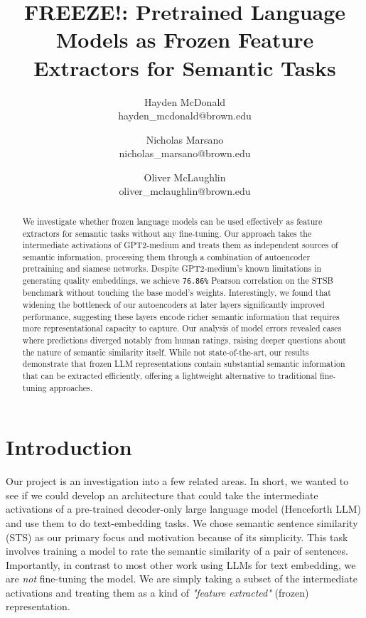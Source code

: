\documentclass[14pt]{article}
\title{FREEZE!: Pretrained Language Models as Frozen Feature Extractors for Semantic Tasks}
\author{
    Hayden McDonald\\hayden\_mcdonald@brown.edu \and 
    Nicholas Marsano\\nicholas\_marsano@brown.edu\and 
    Oliver McLaughlin\\oliver\_mclaughlin@brown.edu
}
\begin{document}
\maketitle


\begin{abstract}
    We investigate whether frozen language models can be used effectively as feature extractors for semantic tasks without any fine-tuning. Our approach takes the intermediate activations of GPT2-medium and treats them as independent sources of semantic information, processing them through a combination of autoencoder pretraining and siamese networks. Despite GPT2-medium's known limitations in generating quality embeddings, we achieve \verb|76.86%| Pearson correlation on the STSB benchmark without touching the base model's weights. Interestingly, we found that widening the bottleneck of our autoencoders at later layers significantly improved performance, suggesting these layers encode richer semantic information that requires more representational capacity to capture. Our analysis of model errors revealed cases where predictions diverged notably from human ratings, raising deeper questions about the nature of semantic similarity itself. While not state-of-the-art, our results demonstrate that frozen LLM representations contain substantial semantic information that can be extracted efficiently, offering a lightweight alternative to traditional fine-tuning approaches.
\end{abstract}
\setcounter{tocdepth}{4}
\setcounter{secnumdepth}{4}
\tableofcontents
\newpage

\section{Introduction}
Our project is an investigation into a few related areas. In short, we wanted to see if we could develop an architecture that could take the intermediate activations of a pre-trained decoder-only large language model (Henceforth LLM) and use them to do text-embedding tasks. We chose semantic sentence similarity (STS) as our primary focus and motivation because of its simplicity. This task involves training a model to rate the semantic similarity of a pair of sentences. Importantly, in contrast to most other work using LLMs for text embedding, we are \textit{not} fine-tuning the model. We are simply taking a subset of the intermediate activations and treating them as a kind of \textit{"feature extracted"} (frozen) representation.
\end{document}
